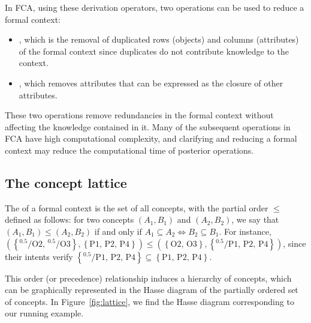 In FCA, using these derivation operators, two operations can be used to
reduce a formal context:

\begin{itemize}
\tightlist
\item
  , which is the removal of duplicated rows (objects)
  and columns (attributes) of the formal context since duplicates do not
  contribute knowledge to the context.
\item
  , which removes attributes that can be expressed as the
  closure of other attributes.
\end{itemize}

These two operations remove redundancies in the formal context without
affecting the knowledge contained in it. Many of the subsequent
operations in FCA have high computational complexity, and clarifying and
reducing a formal context may reduce the computational time of posterior
operations.

\hypertarget{the-concept-lattice}{%
\subsection{The concept lattice}\label{the-concept-lattice}}

The  of a formal context is the set of all
concepts, with the partial order \(\le\) defined as follows: for two
concepts \((A_1, B_1)\) and \((A_2, B_2)\), we say that
\((A_1, B_1) \le (A_2, B_2)\) if and only if
\(A_1 \subseteq A_2 \iff B_2 \subseteq B_1\). For instance,
\(\ensuremath{\left(\ensuremath{\left\{{^{0.5}}\!/\mathrm{O2},\, {^{0.5}}\!/\mathrm{O3}\right\}}, \ensuremath{\left\{\mathrm{P1},\, \mathrm{P2},\, \mathrm{P4}\right\}}\right)}  \le \ensuremath{\left(\ensuremath{\left\{\mathrm{O2},\, \mathrm{O3}\right\}}, \ensuremath{\left\{{^{0.5}}\!/\mathrm{P1},\, \mathrm{P2},\, \mathrm{P4}\right\}}\right)}\),
since their intents verify
\(\ensuremath{\left\{{^{0.5}}\!/\mathrm{P1},\, \mathrm{P2},\, \mathrm{P4}\right\}} \subseteq \ensuremath{\left\{\mathrm{P1},\, \mathrm{P2},\, \mathrm{P4}\right\}}\).

This order (or precedence) relationship induces a hierarchy of concepts,
which can be graphically represented in the Hasse diagram
\citep{birkhoff1940lattice} of the partially ordered set of concepts. In
Figure~\ref{fig:lattice}, we find the Hasse diagram corresponding to our
running example.

